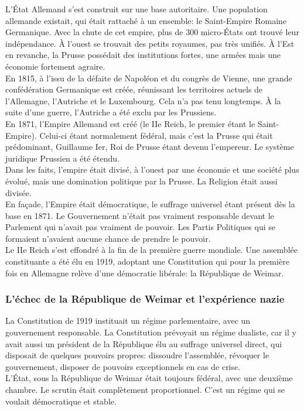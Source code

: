 \documentclass[10pt, a4paper, openany]{book}
\begin{document}
L'État Allemand s'est construit sur une base autoritaire. Une population allemande existait, qui était rattaché à un ensemble: le Saint-Empire Romaine Germanique. Avec la chute de cet empire, plus de 300 micro-États ont trouvé leur indépendance. À l'ouest se trouvait des petits royaumes, pas très unifiés. À l'Est en revanche, la Prusse possédait des institutions fortes, une armées mais une économie fortement agraire. \\
En 1815, à l'issu de la défaite de Napoléon et du congrès de Vienne, une grande confédération Germanique est créée, réunissant les territoires actuels de l'Allemagne, l'Autriche et le Luxembourg. Cela n'a pas tenu longtemps. À la suite d'une guerre, l'Autriche a été exclu par les Prussiens. \\
En 1871, l'Empire Allemand est créé (le IIe Reich, le premier étant le Saint-Empire). Celui-ci étant normalement fédéral, mais c'est la Prusse qui était prédominant, Guillaume Ier, Roi de Prusse étant devenu l'empereur. Le système juridique Prussien a été étendu. \\
Dans les faits, l'empire était divisé, à l'ouest par une économie et une société plus évolué, mais une domination politique par la Prusse. La Religion était aussi divisée. \\
En façade, l'Empire était démocratique, le suffrage universel étant présent dès la base en 1871. Le Gouvernement n'était pas vraiment responsable devant le Parlement qui n'avait pas vraiment de pouvoir. Les Partis Politiques qui se formaient n'avaient aucune chance de prendre le pouvoir. \\
Le IIe Reich s'est effondré à la fin de la première guerre mondiale. Une assemblée constituante a été élu en 1919, adoptant une Constitution qui pour la première fois en Allemagne relève d'une démocratie libérale: la République de Weimar. 

\subsubsection{L'échec de la République de Weimar et l'expérience nazie}

La Constitution de 1919 instituait un régime parlementaire, avec un gouvernement responsable. La Constitution prévoyait un régime dualiste, car il y avait aussi un président de la République élu au suffrage universel direct, qui disposait de quelques pouvoirs propres: dissoudre l'assemblée, révoquer le gouvernement, disposer de pouvoirs exceptionnels en cas de crise. \\
L'État, sous la République de Weimar était toujours fédéral, avec une deuxième chambre. Le scrutin était complètement proportionnel. C'est un régime qui se voulait démocratique et stable. 
\end{document}
